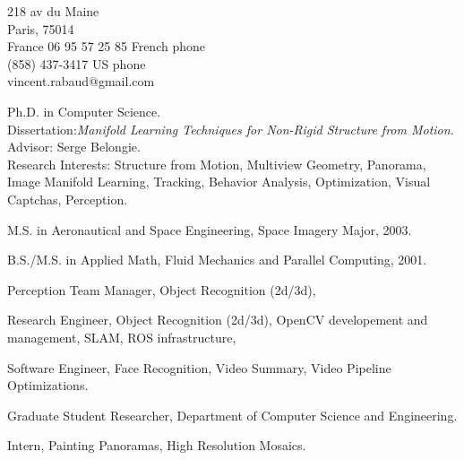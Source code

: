 

\addresses
{218 av du Maine\\
Paris, 75014\\
France}
{
06 95 57 25 85 French phone\\
(858) 437-3417 US phone\\
vincent.rabaud@gmail.com}

\begin{llist}

 
Ph.D. in Computer Science.\\
Dissertation:\textit{Manifold Learning Techniques for Non-Rigid Structure from
Motion}.\\
Advisor: Serge Belongie.\\
Research Interests: Structure from Motion, Multiview Geometry, Panorama, Image Manifold Learning, Tracking, Behavior Analysis, Optimization, Visual Captchas, Perception.

 
M.S. in Aeronautical and Space Engineering, Space Imagery Major, 2003.

 
B.S./M.S. in Applied Math, Fluid Mechanics and Parallel Computing, 2001.

Perception Team Manager, Object Recognition (2d/3d),

Research Engineer, Object Recognition (2d/3d), OpenCV developement and management, SLAM, ROS infrastructure, 

Software Engineer, Face Recognition, Video Summary, Video Pipeline
Optimizations.

Graduate Student Researcher, Department of Computer Science and Engineering.

Intern, Painting Panoramas, High Resolution Mosaics.


\end{llist}
